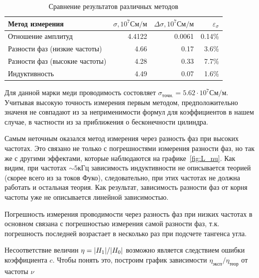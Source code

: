 \documentclass[a4paper]{article}
\begin{document}
\begin{table}[!h]
    \begin{center}
        \begin{tabular}{lrrr}
            Метод измерения                & $\sigma, 10^{7} См/м$ & $\Delta\sigma, 10^{7} См/м$ & $\varepsilon_{\sigma}$ \\
            \toprule
            Отношение амплитуд             & 4.4122                & 0.0061                      & 0.14\%                 \\
            Разности фаз (низкие частоты)  & 4.66                  & 0.17                        & 3.6\%                  \\
            Разности фаз (высокие частоты) & 4.28                  & 0.33                        & 7.7\%                  \\
            Индуктивность                  & 4.49                  & 0.07                        & 1.6\%                  \\
        \end{tabular}
    \end{center}
    \caption{Сравнение результатов различных методов}\label{}
\end{table}

Для данной марки меди проводимость состовляет $\sigma_{точн.} = 5.62\cdot10^{7} См/м$.
Учитывая высокую точность измерения первым методом, предположительно значеня не совпадают
из за неприменимости формул для коэффициентов в нашем случае, в частности из за
приближения о бесконечности цилиндра.

Самым неточным оказался метод измерения через разность фаз при высоких частотах. Это
связано не только с погрешностями измерения разности фаз, но так же с другими эффектами,
которые наблюдаются на графике~\ref{fig:L_nu}. Как видим, при частотах $\sim 5кГц$
зависимость индуктивности не описывается теорией (скорее всего из за токов
Фуко), следовательно, при этих частотах не должна работать и остальная теория.
Как результат, зависимость разности фаз от корня частоты уже не описывается линейной
зависимостью.

Погрешность измерения проводимости через разность фаз при низких частотах в основном
связана с погрешностью измерения самой разности фаз, т.к. погрешность последней
возрастает в несколько раз при подсчете тангенса угла.

Несоответствие величин $\eta = \abs{H_1}/\abs{H_0}$ возможно является следствием ошибки
коэффициента $c$. Чтобы понять это, построим график зависимости $\eta_{эксп}/\eta_{теор}$
от частоты $\nu$
\end{document}
